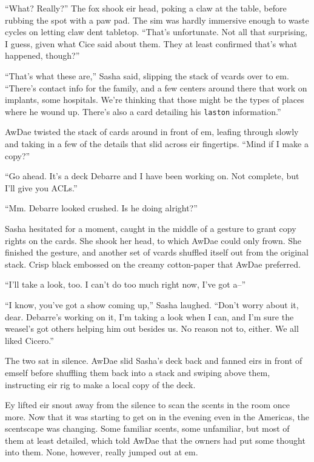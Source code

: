 ``What? Really?'' The fox shook eir head, poking a claw at the table, before rubbing the spot with a paw pad. The sim was hardly immersive enough to waste cycles on letting claw dent tabletop. ``That's unfortunate. Not all that surprising, I guess, given what Cice said about them. They at least confirmed that's what happened, though?''

``That's what these are,'' Sasha said, slipping the stack of vcards over to em. ``There's contact info for the family, and a few centers around there that work on implants, some hospitals. We're thinking that those might be the types of places where he wound up. There's also a card detailing his \texttt{laston} information.''

AwDae twisted the stack of cards around in front of em, leafing through slowly and taking in a few of the details that slid across eir fingertips. ``Mind if I make a copy?''

``Go ahead. It's a deck Debarre and I have been working on. Not complete, but I'll give you ACLs.''

``Mm. Debarre looked crushed. Is he doing alright?''

Sasha hesitated for a moment, caught in the middle of a gesture to grant copy rights on the cards. She shook her head, to which AwDae could only frown. She finished the gesture, and another set of vcards shuffled itself out from the original stack. Crisp black embossed on the creamy cotton-paper that AwDae preferred.

``I'll take a look, too. I can't do too much right now, I've got a--''

``I know, you've got a show coming up,'' Sasha laughed. ``Don't worry about it, dear. Debarre's working on it, I'm taking a look when I can, and I'm sure the weasel's got others helping him out besides us. No reason not to, either. We all liked Cicero.''

The two sat in silence. AwDae slid Sasha's deck back and fanned eirs in front of emself before shuffling them back into a stack and swiping above them, instructing eir rig to make a local copy of the deck.

Ey lifted eir snout away from the silence to scan the scents in the room once more. Now that it was starting to get on in the evening even in the Americas, the scentscape was changing. Some familiar scents, some unfamiliar, but most of them at least detailed, which told AwDae that the owners had put some thought into them. None, however, really jumped out at em.

